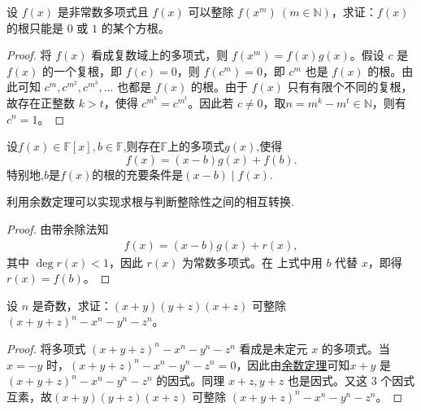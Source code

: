 \documentclass[../../main.tex]{subfiles}%
\begin{document}
\begin{example}
设 $f(x)$ 是非常数多项式且 $f(x)$ 可以整除 $f(x^m) \ (m \in \mathbb{N})$，求证：$f(x)$ 的根只能是 $0$ 或 $1$ 的某个方根。
\end{example}
\begin{proof}

将 $f(x)$ 看成复数域上的多项式，则 $f(x^m) = f(x)g(x)$。假设 $c$ 是 $f(x)$ 的一个复根，即 $f(c) = 0$，则 $f(c^m) = 0$，即 $c^m$ 也是 $f(x)$ 的根。由此可知 $c^m, c^{m^2}, c^{m^3}, \ldots$ 也都是 $f(x)$ 的根。由于 $f(x)$ 只有有限个不同的复根，故存在正整数 $k>t$，使得 $c^{m^k} = c^{m^t}$。因此若 $c \neq 0$，取$n=m^k-m^t\in \mathbb{N}$，则有 $c^n = 1$。

\end{proof}


\begin{theorem}[余数定理]\label{theorem:余数定理}
设\(f(x)\in\mathbb{F}[x], b\in\mathbb{F}\),则存在\(\mathbb{F}\)上的多项式\(g(x)\),使得
\[
f(x)=(x - b)g(x)+f(b).
\]
特别地,\(b\)是\(f(x)\)的根的充要条件是\((x - b)\mid f(x)\).
\end{theorem}
\begin{note}
利用余数定理可以实现求根与判断整除性之间的相互转换.
\end{note}
\begin{proof}

由带余除法知
\begin{align*}
f(x) = (x - b)g(x) + r(x),
\end{align*}
其中 $\deg r(x) < 1$，因此 $r(x)$ 为常数多项式。在 上式中用 $b$ 代替 $x$，即得 $r(x) = f(b)$。

\end{proof}

\begin{example}
设 $n$ 是奇数，求证：$(x + y)(y + z)(x + z)$ 可整除 $(x + y + z)^n - x^n - y^n - z^n$。
\end{example}
\begin{proof}

将多项式 $(x + y + z)^n - x^n - y^n - z^n$ 看成是未定元 $x$ 的多项式。当 $x = -y$ 时，$(x + y + z)^n - x^n - y^n - z^n = 0$，因此由\hyperref[theorem:余数定理]{余数定理}可知$x + y$ 是 $(x + y + z)^n - x^n - y^n - z^n$ 的因式。同理 $x + z, y + z$ 也是因式。又这 3 个因式互素，故$(x + y)(y + z)(x + z)$ 可整除 $(x + y + z)^n - x^n - y^n - z^n$。

\end{proof}
\end{document}
